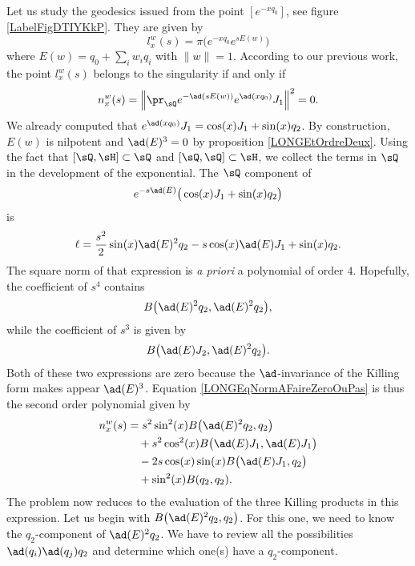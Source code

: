 Let us study the geodesics issued from the point $[ e^{-xq_0}]$, see figure \ref{LabelFigDTIYKkP}. They are given by
\begin{equation}
	l^w_x(s)=\pi\big(    e^{-xq_0} e^{sE(w)} \big)
\end{equation}
where $E(w)=q_0+\sum_iw_iq_i$ with $\| w \|=1$. According to our previous work, the point $l^w_x(s)$ belongs to the singularity if and only if 
\begin{equation}		\label{LONGEqNormAFaireZeroOuPas}
	n_x^w(s)=\left\|   \pr_{\sQ} e^{-\ad(sE(w))} e^{\ad(xq_0)}J_1  \right\|^2=0.
\end{equation}
%
We already computed that $ e^{\ad(xq_0)}J_1=\cos(x)J_1+\sin(x)q_2$. By construction, $E(w)$ is nilpotent and $\ad(E)^3=0$ by proposition \ref{LONGEtOrdreDeux}. Using the fact that $[\sQ,\sH]\subset\sQ$ and $[\sQ,\sQ]\subset\sH$, we collect the terms in $\sQ$ in the development of the exponential. The $\sQ$ component of
\begin{equation}
	e^{-s\ad(E)}\big( \cos(x)J_1+\sin(x)q_2 \big)
\end{equation}
is 
\begin{equation}
	\ell=\frac{ s^2 }{ 2 }\sin(x)\ad(E)^2q_2-s\cos(x)\ad(E)J_1+\sin(x)q_2.
\end{equation}
The square norm of that expression is \emph{a priori} a polynomial of order $4$. Hopefully, the coefficient of $s^4$ contains
\begin{equation}
	B\big( \ad(E)^2q_2,\ad(E)^2q_2 \big),
\end{equation}
while the coefficient of $s^3$ is given by
\begin{equation}
	B\big( \ad(E)J_2,\ad(E)^2q_2 \big).
\end{equation}
Both of these two expressions are zero because the $\ad$-invariance of the Killing form makes appear $\ad(E)^3$. Equation \eqref{LONGEqNormAFaireZeroOuPas} is thus the second order polynomial given by
%
%
\begin{equation}		\label{LONGEqnwxBBB}
	\begin{aligned}[]
		n_x^w(s)	&=s^2\sin^2(x)B\big( \ad(E)^2q_2,q_2 \big)\\
				&\quad+s^2\cos^2(x)B\big( \ad(E)J_1,\ad(E) J_1\big)\\
				&\quad-2s\cos(x)\sin(x)B\big( \ad(E)J_1,q_2 \big)\\
				&\quad+\sin^2(x)B(q_2,q_2).
	\end{aligned}
\end{equation}
The problem now reduces to the evaluation of the three Killing products in this expression. %
%
Let us begin with $B\big( \ad(E)^2q_2,q_2 \big)$. For this one, we need to know the $q_2$-component of $\ad(E)^2q_2$. We have to review all the possibilities $\ad(q_i)\ad(q_j)q_2$ and determine which one(s) have a $q_2$-component.

